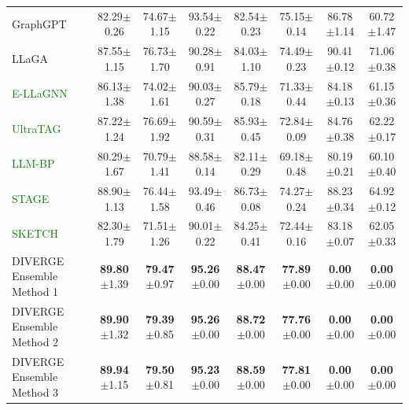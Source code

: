 \documentclass[a4paper,fleqn]{cas-sc}
\newcommand{\revthree}[1]{\textcolor{green}{#1}} %
\begin{document}
\begin{table}[htbp]
\begin{tabular*}{\textwidth}{@{\extracolsep{\fill}} lccccccc @{}}
GraphGPT     & 82.29{\scriptsize$\pm$0.26} & 74.67{\scriptsize$\pm$1.15} & 93.54{\scriptsize$\pm$0.22} & 82.54{\scriptsize$\pm$0.23} & 75.15{\scriptsize$\pm$0.14} & 86.78{\scriptsize$\pm$1.14} & 60.72{\scriptsize$\pm$1.47} \\
LLaGA        & 87.55{\scriptsize$\pm$1.15} & 76.73{\scriptsize$\pm$1.70} & 90.28{\scriptsize$\pm$0.91} & 84.03{\scriptsize$\pm$1.10} & 74.49{\scriptsize$\pm$0.23} & 90.41{\scriptsize$\pm$0.12} & 71.06{\scriptsize$\pm$0.38} \\
\revthree{E-LLaGNN}     & 86.13{\scriptsize$\pm$1.38} & 74.02{\scriptsize$\pm$1.61} & 90.03{\scriptsize$\pm$0.27} & 85.79{\scriptsize$\pm$0.18} & 71.33{\scriptsize$\pm$0.44} & 84.18{\scriptsize$\pm$0.13} & 61.15{\scriptsize$\pm$0.36} \\
\revthree{UltraTAG}     & 87.22{\scriptsize$\pm$1.24} & 76.69{\scriptsize$\pm$1.92} & 90.59{\scriptsize$\pm$0.31} & 85.93{\scriptsize$\pm$0.45} & 72.84{\scriptsize$\pm$0.09} & 84.76{\scriptsize$\pm$0.38} & 62.22{\scriptsize$\pm$0.17} \\
\revthree{LLM-BP}       & 80.29{\scriptsize$\pm$1.67} & 70.79{\scriptsize$\pm$1.41} & 88.58{\scriptsize$\pm$0.14} & 82.11{\scriptsize$\pm$0.29} & 69.18{\scriptsize$\pm$0.48} & 80.19{\scriptsize$\pm$0.21} & 60.10{\scriptsize$\pm$0.40} \\
\revthree{STAGE}        & 88.90{\scriptsize$\pm$1.13} & 76.44{\scriptsize$\pm$1.58} & 93.49{\scriptsize$\pm$0.46} & 86.73{\scriptsize$\pm$0.08} & 74.27{\scriptsize$\pm$0.24} & 88.23{\scriptsize$\pm$0.34} & 64.92{\scriptsize$\pm$0.12} \\
\revthree{SKETCH}       & 82.30{\scriptsize$\pm$1.79} & 71.51{\scriptsize$\pm$1.26} & 90.01{\scriptsize$\pm$0.22} & 84.25{\scriptsize$\pm$0.41} & 72.44{\scriptsize$\pm$0.16} & 83.18{\scriptsize$\pm$0.07} & 62.05{\scriptsize$\pm$0.33} \\
\midrule

DIVERGE Ensemble Method 1 & \textbf{89.80}{\scriptsize$\pm$1.39} & \textbf{79.47}{\scriptsize$\pm$0.97} & \textbf{95.26}{\scriptsize$\pm$0.00} & \textbf{88.47}{\scriptsize$\pm$0.00} & \textbf{77.89}{\scriptsize$\pm$0.00} & \textbf{0.00}{\scriptsize$\pm$0.00} & \textbf{0.00}{\scriptsize$\pm$0.00} \\
DIVERGE Ensemble Method 2 & \textbf{89.90}{\scriptsize$\pm$1.32} & \textbf{79.39}{\scriptsize$\pm$0.85} & \textbf{95.26}{\scriptsize$\pm$0.00} & \textbf{88.72}{\scriptsize$\pm$0.00} & \textbf{77.76}{\scriptsize$\pm$0.00} & \textbf{0.00}{\scriptsize$\pm$0.00} & \textbf{0.00}{\scriptsize$\pm$0.00} \\
DIVERGE Ensemble Method 3 & \textbf{89.94}{\scriptsize$\pm$1.15} & \textbf{79.50}{\scriptsize$\pm$0.81} & \textbf{95.23}{\scriptsize$\pm$0.00} & \textbf{88.59}{\scriptsize$\pm$0.00} & \textbf{77.81}{\scriptsize$\pm$0.00} & \textbf{0.00}{\scriptsize$\pm$0.00} & \textbf{0.00}{\scriptsize$\pm$0.00} \\
\bottomrule
\end{tabular*}
\end{table}
\end{document}
